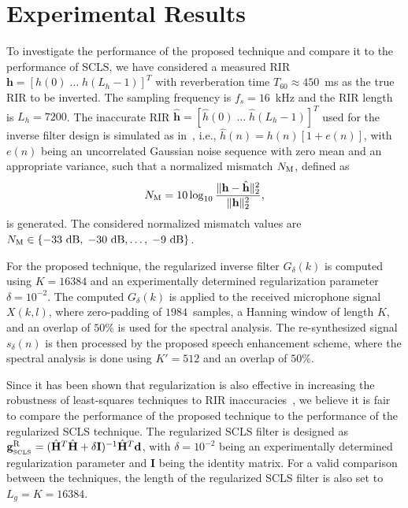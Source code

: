 \documentclass{article}
\begin{document}
\section{Experimental Results}
\label{sec: exp}
To investigate the performance of the proposed technique and compare it to the performance of SCLS, we have considered a measured RIR $\mathbf{h} = [h(0) \; \ldots \; h(L_h-1)]^T$ with reverberation time $T_{60} \approx 450$~ms as the true RIR to be inverted.
The sampling frequency is $f_s = 16$~kHz and the RIR length is $L_h = 7200$. 
The inaccurate RIR $\hat{\mathbf{h}} = [\hat{h}(0) \; \ldots \; \hat{h}(L_h-1)]^T$ used for the inverse filter design is simulated as in~\cite{Cho_ITSA_1999}, i.e., $\hat{h}(n) = h(n) \left[1+e(n) \right]$, with $e(n)$ being an uncorrelated Gaussian noise sequence with zero mean and an appropriate variance, such that a normalized mismatch $N_{\rm M}$, defined as
\begin{equation}
N_{\rm M} = 10 \log_{10}\frac{\|\mathbf{h} - \hat{\mathbf{h}} \|_2^2}{\| \mathbf{h} \|_2^2},
\end{equation}
is generated.
The considered normalized mismatch values are $N_{\rm M} \in \{ -33~{\rm dB}, \;  -30~{\rm dB}, \ldots, \; -9~{\rm dB}\}$.

For the proposed technique, the regularized inverse filter $G_{\delta}(k)$ is computed using $K = 16384$ and an experimentally determined regularization parameter $\delta = 10^{-2}$. 
The computed $G_{\delta}(k)$ is applied to the received microphone signal $X(k,l)$, where zero-padding of $1984$~samples, a Hanning window of length $K$, and an overlap of $50\%$ is used for the spectral analysis. 
The re-synthesized signal $s_{\delta}(n)$ is then processed by the proposed speech enhancement scheme, where the spectral analysis is done using $K' = 512$ and an overlap of $50\%$.

Since it has been shown that regularization is also effective in increasing the robustness of least-squares techniques to RIR inaccuracies~\cite{Hikichi_EURASIP_2007, Kodrasi_ITASLP_2013}, we believe it is fair to compare the performance of the proposed technique to the performance of the regularized SCLS technique.
The regularized SCLS filter is designed as $ \mathbf{g}_{_{\rm SCLS}}^{\rm R} = (\hat{\mathbf{H}}^T\hat{\mathbf{H}} + \delta \mathbf{I})^{-1} \hat{\mathbf{H}}^T\mathbf{d}$, with $\delta = 10^{-2}$ being an experimentally determined regularization parameter and $\mathbf{I}$ being the identity matrix.
For a valid comparison between the techniques, the length of the regularized SCLS filter is also set to $L_g = K = 16384$.
\end{document}
